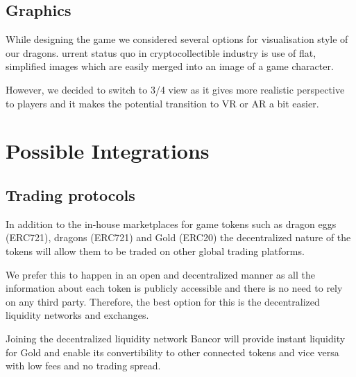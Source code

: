 \documentclass[12pt]{article}
\begin{document}

\vspace{\baselineskip}\subsection{Graphics}
  \label{Graphics}  \par

While designing the game we considered several options for visualisation style of our dragons. urrent status quo in cryptocollectible industry is  use of flat, simplified images which are easily merged into an image of a game character.\par

However, we decided to switch to 3/4 view as it gives more realistic perspective to players and it makes the potential transition to VR or AR a bit easier.


\newpage
\par

\section{Possible Integrations}
 \label{Possible Integrations}  \par


\vspace{\baselineskip}
\subsection{Trading protocols}\label{Trading protocols}\par

In addition to the in-house marketplaces for game tokens such as dragon eggs (ERC721), dragons (ERC721) and Gold (ERC20) the decentralized nature of the tokens will allow them to be traded on other global trading platforms.\par

We prefer this to happen in an open and decentralized manner as all the information about each token is publicly accessible and there is no need to rely on any third party. Therefore, the best option for this is the decentralized liquidity networks and exchanges.\par

Joining the decentralized liquidity network Bancor will provide instant liquidity for Gold and enable its convertibility to other connected tokens and vice versa with low fees and no trading spread.\par
\end{document}
